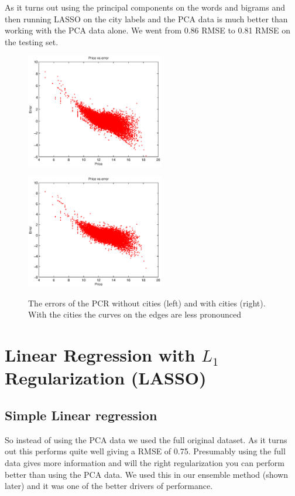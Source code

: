 \documentclass[a4paper,10pt]{article}
\begin{document}
As it turns out using the principal components on the words and bigrams and then running LASSO on the city labels and the PCA data is much better than working with the PCA data alone. We went from 0.86 RMSE to 0.81 RMSE on the testing set.

\begin{figure}[H]
 \centering
 \begin{minipage}{.5\textwidth}
    \centering
    \includegraphics[width=6.0cm]{PCRPriceVsError.eps}
    \label{fig:fig1}
  \end{minipage}%
  \begin{minipage}{.5\textwidth}
    \centering
    \includegraphics[width=6.0cm]{PCRPriceVsErrorWithCities.eps}
    \label{fig:fig2}
  \end{minipage}
 \caption{The errors of the PCR without cities (left) and with cities (right).
	  With the cities the curves on the edges are less pronounced}
\end{figure}


\section{Linear Regression with $L_1$ Regularization (LASSO)}
\subsection*{Simple Linear regression}
So instead of using the PCA data we used the full original dataset. As it turns out this performs quite well giving a RMSE of 0.75. Presumably using the full data gives more information and will the right regularization you can perform better than using the PCA data. We used this in our ensemble method (shown later) and it was one of the better drivers of performance.
\end{document}
